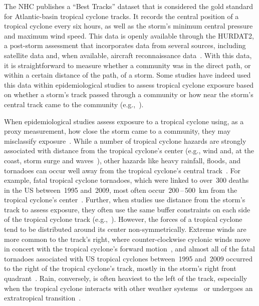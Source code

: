 The \ac{NHC} publishes a ``Best Tracks'' dataset that is considered the gold
standard for Atlantic-basin tropical cyclone tracks.  It records the central
position of a tropical cyclone every six hours, as well as the storm's minimum
central pressure and maximum wind speed.  This data is openly available through
the \ac{HURDAT2}, a post-storm assessment that incorporates data from several
sources, including satellite data and, when available, aircraft reconnaissance
data~\parencite{landsea2013, jarvinen1988}.  With this data, it is
straightforward to measure whether a community was in the direct path, or
within a certain distance of the path, of a storm. Some studies have indeed
used this data within epidemiological studies to assess tropical cyclone
exposure based on whether a storm's track passed through a community or how
near the storm's central track came to the community (e.g.,~\cite{currie2013,
kinney2008, caillouet2008increase}).

When epidemiological studies assess exposure to a tropical cyclone using, as a
proxy measurement, how close the storm came to a community, they may
misclassify exposure~\parencite{grabich2015measuring}. While a number of
tropical cyclone hazards are strongly associated with distance from the
tropical cyclone's center (e.g., wind and, at the coast, storm surge and
waves~\parencite{rappaport2000, kruk2010}), other hazards like heavy rainfall,
floods, and tornadoes can occur well away from the tropical cyclone's central
track~\parencite{rappaport2000, atallah2007, moore2012}.  For example, fatal
tropical cyclone tornadoes, which were linked to over~300 deaths in the \ac{US}
between~1995 and~2009, most often occur~200\,--\,500~\si{\kilo\metre} from the
tropical cyclone's center~\parencite{moore2012}.  Further, when studies use
distance from the storm's track to assess exposure, they often use the same
buffer constraints on each side of the tropical cyclone track
(e.g.,~\cite{czajkowski2011, kinney2008, currie2013}).  However, the forces of
a tropical cyclone tend to be distributed around its center non-symmetrically.
Extreme winds are more common to the track's right, where counter-clockwise
cyclonic winds move in concert with the tropical cyclone's forward
motion~\parencite{halverson2015}, and almost all of the fatal tornadoes
associated with \ac{US} tropical cyclones between~1995 and~2009 occurred to the
right of the tropical cyclone's track, mostly in the storm's right front
quadrant~\parencite{moore2012}. Rain, conversely, is often heaviest to the left
of the track, especially when the tropical cyclone interacts with other weather
systems~\parencite{atallah2003, atallah2007, zhu2013variations} or undergoes an
extratropical transition~\parencite{elsberry2002}.  

